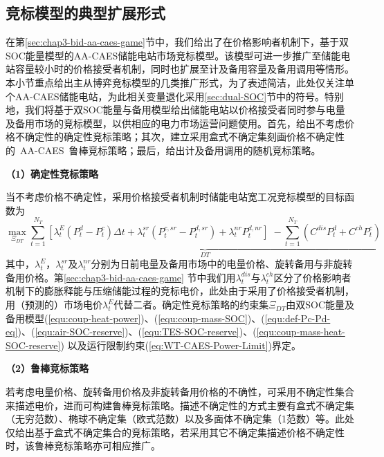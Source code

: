 \subsection{竞标模型的典型扩展形式}
\label{sec:chap3-self-schedu}

在第\ref{sec:chap3-bid-aa-caes-game}节中，我们给出了在价格影响者机制下，基于双SOC能量模型的AA-CAES储能电站市场竞标模型。该模型可进一步推广至储能电站容量较小时的价格接受者机制，同时也扩展至计及备用容量及备用调用等情形。本小节重点给出主从博弈竞标模型的几类推广形式，为了表述简洁，此处仅关注单个AA-CAES储能电站，为此相关变量退化采用\ref{sec:dual-SOC}节中的符号。特别地，我们将基于双SOC能量与备用模型给出储能电站以价格接受者同时参与电量及备用市场的竞标模型，以供相应的电力市场运营问题使用。首先，给出不考虑价格不确定性的确定性竞标策略；其次，建立采用盒式不确定集刻画价格不确定性的~AA-CAES~鲁棒竞标策略；最后，给出计及备用调用的随机竞标策略。

\textbf{（1）确定性竞标策略}

当不考虑价格不确定性，采用价格接受者机制时储能电站宽工况竞标模型的目标函数为
\begin{equation}
\label{equ:aa-caes-self-schedule-DT}
\mathop {\max }\limits_{\Xi_{DT}}  \underbrace {\sum\limits_{t = 1}^{N_T} {\left[ {\lambda_t^E({P_t^d - P_t^c})\Delta t + \lambda_t^{sr}({P_t^{c,sr} - P_t^{d,sr}}) + \lambda_t^{nr}P_t^{d,nr}} \right]} \; - \sum\limits_{t = 1}^{N_T} {({C^{dis}P_t^d + C^{ch}P_t^c})} }_{DT}
\end{equation}
其中，$\lambda_t^E$，$\lambda_t^{sr}$及$\lambda_t^{nr}$分别为日前电量及备用市场中的电量价格、旋转备用与非旋转备用价格。第\ref{sec:chap3-bid-aa-caes-game} 节中我们用$\lambda_t^{dis}$与$\lambda_t^{ch}$区分了价格影响者机制下的膨胀释能与压缩储能过程的竞标电价，此处由于采用了价格接受者机制，用（预测的）市场电价$\lambda_t^E$代替二者。确定性竞标策略的约束集$\Xi_{DT}$由双SOC能量及备用模型(\ref{equ:coup-heat-power})、(\ref{equ:coup-mass-SOC})、(\ref{equ:def-Pc-Pd-eq})、(\ref{equ:air-SOC-reserve})、(\ref{equ:TES-SOC-reserve})、(\ref{equ:coup-mass-heat-SOC-reserve})
以及运行限制约束(\ref{eq:WT-CAES-Power-Limit})界定。

\textbf{（2）鲁棒竞标策略}

若考虑电量价格、旋转备用价格及非旋转备用价格的不确性，可采用不确定性集合来描述电价，进而可构建鲁棒竞标策略。描述不确定性的方式主要有盒式不确定集（无穷范数）、椭球不确定集（欧式范数）以及多面体不确定集（1范数）等\cite{Robust-Self-Schedule-Review-18}。此处仅给出基于盒式不确定集合的竞标策略，若采用其它不确定集描述价格不确定性时，该鲁棒竞标策略亦可相应推广。

